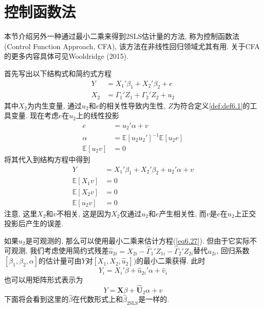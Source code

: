 \documentclass[cn, 12pt, math=mtpro2, bibstyle=apa, blue, twocol]{elegantbook}
\newcommand{\E}{\mathbb{E}}
\newcommand{\X}{\mathbold{X}}
\newcommand{\hb}{\hat{\beta}}
\begin{document}
\section{控制函数法}
本节介绍另外一种通过最小二乘来得到2SLS估计量的方法, 称为控制函数法 (Control Function Approach, CFA), 该方法在非线性回归领域尤其有用. 关于CFA的更多内容具体可见Wooldridge (2015).

首先写出以下结构式和简约式方程
\begin{align*}
Y&=X_1'\beta_1+X_2'\beta_2+e \\
X_2&=\Gamma_1'Z_1+\Gamma_2'Z_2+u_2
\end{align*}
其中$X_2$为内生变量, 通过$u_2$和$e$的相关性导致内生性, $Z$为符合定义\ref{def:def6.1}的工具变量. 现在考虑$e$在$u_2$上的线性投影
\begin{align*}
e&=u_2'\alpha+v \\
\alpha&=\E[u_2u_2']^{-1}\E[u_2e] \\
\E[u_2v]&=0
\end{align*}
将其代入到结构方程中得到
\begin{align}
Y&=X_1'\beta_1+X_2'\beta_2+u_2'\alpha+v \label{eq6.27} \\
\E[X_1v]&=0 \nonumber \\
\E[X_2v]&=0 \nonumber \\
\E[u_2v]&=0 \nonumber
\end{align}
注意, 这里$X_2$和$v$不相关, 这是因为$X_2$仅通过$u_2$和$e$产生相关性, 而$v$是$e$在$u_2$上正交投影后产生的误差.

如果$u_2$是可观测的, 那么可以使用最小二乘来估计方程(\ref{eq6.27}). 但由于它实际不可观测, 我们考虑使用简约式残差$\hat{u}_{2i}=X_{2i}-\hat{\Gamma}_1'Z_{1i}-\hat{\Gamma}_2'Z_{2i}$替代$u_{2i}$, 回归系数$[\beta_1,\beta_2,\alpha]$的估计量可由$Y$对$[X_1,X_2,\hat{u}_2])$的最小二乘获得. 此时
\begin{equation}\label{eq6.28}
  Y_i=X_i'\beta+\hat{u}_{2i}'\alpha+\hat{v}_i
\end{equation}
也可以用矩阵形式表示为
$$Y=\X\beta+\hat{\mathbold{U}}_2\alpha+v$$
下面将会看到这里的$\hb$在代数形式上和$\hb_{\text{2SLS}}$是一样的.
\end{document}

